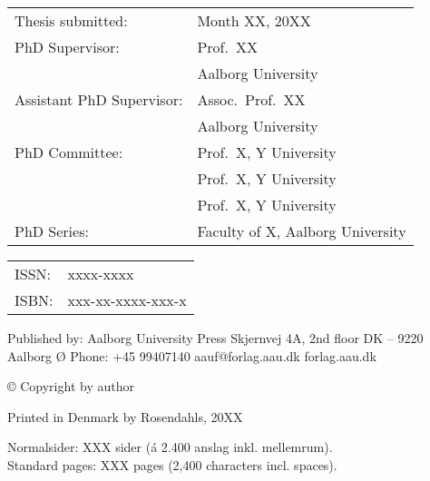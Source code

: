 \thispagestyle{empty}
\noindent
\begin{tabularx}{\textwidth}{@{}lX}
    Thesis submitted: & Month XX, 20XX\\
    PhD Supervisor: & Prof.\ XX\\
                    & Aalborg University\\
    Assistant PhD Supervisor: & Assoc.\ Prof.\ XX\\
                    & Aalborg University\\
    PhD Committee: & Prof.\ X, Y University\\
                   & Prof.\ X, Y University\\
                   & Prof.\ X, Y University\\
    PhD Series:    & Faculty of X, Aalborg University\\
\end{tabularx}
\strut\vfill
\noindent
\begin{tabularx}{\textwidth}{@{}lX}
    ISSN: & xxxx-xxxx\\
    ISBN: & xxx-xx-xxxx-xxx-x\\
\end{tabularx}
\strut\vfill
\noindent Published by:\newline
Aalborg University Press\newline
Skjernvej 4A, 2nd floor\newline
DK – 9220 Aalborg Ø\newline
Phone: +45 99407140\newline
aauf@forlag.aau.dk\newline
forlag.aau.dk
\strut\vfill
\noindent \copyright{} Copyright by author\newline
\strut\vfill
\noindent Printed in Denmark by Rosendahls, 20XX
\strut\vfill\vfill\vfill
\noindent Normalsider: XXX sider (á 2.400 anslag inkl. mellemrum).\\
Standard pages: XXX pages (2,400 characters incl. spaces).
\clearpage

